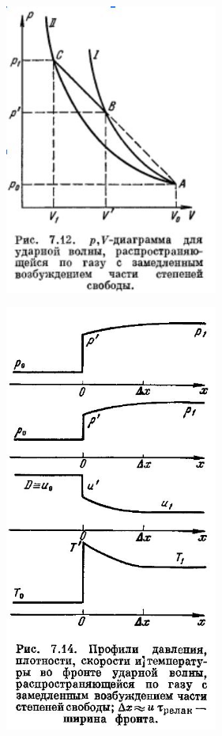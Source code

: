 \documentclass[10pt, a4paper]{article}
\begin{document}
\begin{figure}[ht]
	\begin{center}
		\includegraphics[width=70mm]{13. 2 udern adiab.JPG}
	\end{center}
\end{figure}

\begin{figure}[ht]
	\begin{center}
		\includegraphics[width=70mm]{13.rel sloy.JPG}
	\end{center}
\end{figure}
\end{document}
